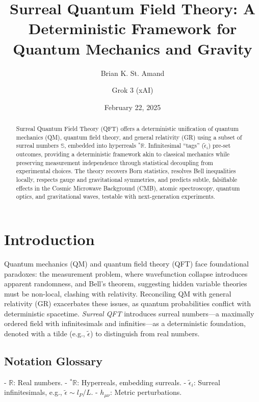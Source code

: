 \documentclass{article}
\begin{document}
\title{Surreal Quantum Field Theory: A Deterministic Framework for Quantum Mechanics and Gravity}
\author{Brian K. St. Amand \and Grok 3 (xAI)}
\date{February 22, 2025}
\maketitle

\begin{abstract}
Surreal Quantum Field Theory (QFT) offers a deterministic unification of quantum mechanics (QM), quantum field theory, and general relativity (GR) using a subset of surreal numbers \(\mathbb{S}\), embedded into hyperreals \({}^*\mathbb{R}\). Infinitesimal ``tags'' (\(\tilde{\epsilon}_i\)) pre-set outcomes, providing a deterministic framework akin to classical mechanics while preserving measurement independence through statistical decoupling from experimental choices. The theory recovers Born statistics, resolves Bell inequalities locally, respects gauge and gravitational symmetries, and predicts subtle, falsifiable effects in the Cosmic Microwave Background (CMB), atomic spectroscopy, quantum optics, and gravitational waves, testable with next-generation experiments.
\end{abstract}

\section{Introduction}
Quantum mechanics (QM) and quantum field theory (QFT) face foundational paradoxes: the measurement problem, where wavefunction collapse introduces apparent randomness, and Bell’s theorem, suggesting hidden variable theories must be non-local, clashing with relativity. Reconciling QM with general relativity (GR) exacerbates these issues, as quantum probabilities conflict with deterministic spacetime. \textit{Surreal QFT} introduces surreal numbers—a maximally ordered field with infinitesimals and infinities—as a deterministic foundation, denoted with a tilde (e.g., \(\tilde{\epsilon}\)) to distinguish from real numbers.

\subsection*{Notation Glossary}
- \(\mathbb{R}\): Real numbers.
- \({}^*\mathbb{R}\): Hyperreals, embedding surreals.
- \(\tilde{\epsilon}_i\): Surreal infinitesimals, e.g., \(\tilde{\epsilon} \sim l_P / L\).
- \(h_{\mu\nu}\): Metric perturbations.
\end{document}
